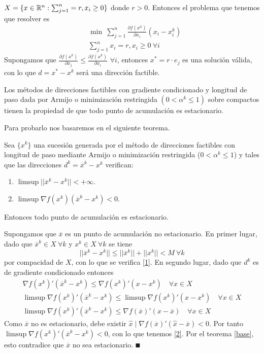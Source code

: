 \documentclass[MIOP.tex]{subfiles}
\begin{document}
\begin{ej}
$X=\{x\in\mathbb{R}^n:\sum_{j=1}^n=r, x_i\geq 0\}$ donde $r>0$. Entonces  el problema que tenemos que resolver es
\begin{align*}
&\min\  \sum_{j=1}^n\frac{\partial f(x^k)}{\partial x_i}(x_i-x^k_i)\\
&\sum_{j=1}^nx_i=r, x_i\geq 0\ \forall i								
\end{align*}
Supongamos que $\frac{\partial f(x^k)}{\partial x_j}\leq\frac{\partial f(x^k)}{\partial x_i}$ $\forall i$, entonces $x^* = r\cdot e_j$ es una solución válida, con lo que $d=x^*-x^k$ será una dirección factible.
\end{ej}

\begin{teorema}\label{teorema}
Los métodos de direcciones factibles con gradiente condicionado y longitud de paso dada por Armijo o minimización restringida $(0<\alpha^k\leq 1)$ sobre compactos tienen la propiedad de que todo punto de acumulación es estacionario. 
\end{teorema}

Para probarlo nos basaremos en el siguiente teorema. 

\begin{teorema}[base]\label{base}
Sea $\{x^k\}$ una sucesión generada por el método de direcciones factibles con longitud de paso mediante Armijo o minimización restringida ($0<\alpha^k\leq 1$) y tales que las direcciones $d^k=\overline{x}^k-x^k$ verifican:
\begin{enumerate}
\item\label{1} $\limsup||\overline{x}^k-x^k||<+\infty$.
\item\label{2} $\limsup \nabla f(x^k)(\overline{x}^k-x^k)<0$.
\end{enumerate}
Entonces todo punto de acumulación es estacionario.
\end{teorema}
\begin{dem} 
Supongamos que $\overline{x}$ es un punto de acumulación no estacionario. En primer lugar, dado que $\overline{x}^k\in X\ \forall k$ y $x^k\in X\ \forall k$ se tiene
$$||\overline{x}^k-x^k||\leq ||\overline{x}^k||+||x^k||<M\ \forall k$$
por compacidad de $X$, con lo que se verifica \ref{1}. En segundo lugar, dado que $d^k$ es de gradiente condicionado entonces
\begin{gather*}
\nabla f(x^k)'(\overline{x}^k-x^k)\leq \nabla f(x^k)'(x-x^k)\quad \forall x\in X\\
\limsup \nabla f(x^k)'(\overline{x}^k-x^k)\leq \limsup\nabla f(x^k)'(x-x^k) \quad \forall x\in X\\
\limsup \nabla f(x^k)'(\overline{x}^k-x^k)\leq\nabla f(\overline{x})'(x-\overline{x}) \quad \forall x\in X
\end{gather*}
Como $\overline{x}$ no es estacionario, debe existir $\hat{x}\mid \nabla f(\overline{x})'(\hat{x}-\overline{x})<0$. Por tanto $\limsup \nabla f(x^k)'(\overline{x}^k-x^k)<0$, con lo que tenemos \ref{2}. Por el teorema \ref{base}, esto contradice que $\overline{x}$ no sea estacionario. $\QED$
\end{dem}
\end{document}

